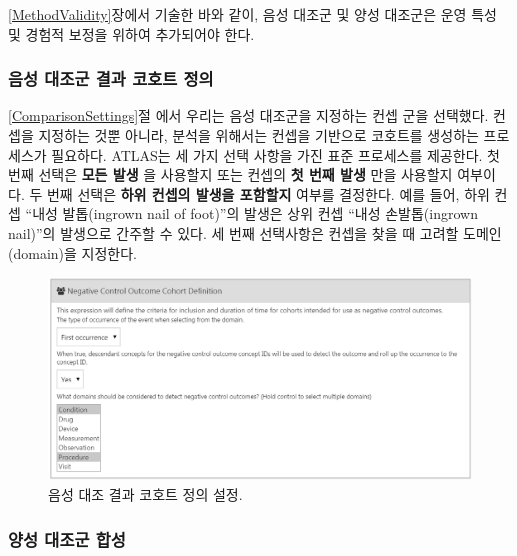 \documentclass[11pt]{book}
\theoremstyle{definition}
\theoremstyle{definition}
\theoremstyle{definition}
\theoremstyle{remark}
\begin{document}
\ref{MethodValidity}장에서 기술한 바와 같이, 음성 대조군 및 양성
대조군은 운영 특성 및 경험적 보정을 위하여 추가되어야 한다.

\subsubsection*{음성 대조군 결과 코호트 정의}\label{----}

\ref{ComparisonSettings}절 에서 우리는 음성 대조군을 지정하는 컨셉 군을
선택했다. 컨셉을 지정하는 것뿐 아니라, 분석을 위해서는 컨셉을 기반으로
코호트를 생성하는 프로세스가 필요하다. ATLAS는 세 가지 선택 사항을 가진
표준 프로세스를 제공한다. 첫 번째 선택은 \textbf{모든 발생} 을 사용할지
또는 컨셉의 \textbf{첫 번째 발생} 만을 사용할지 여부이다. 두 번째 선택은
\textbf{하위 컨셉의 발생을 포함할지} 여부를 결정한다. 예를 들어, 하위
컨셉 ``내성 발톱(ingrown nail of foot)''의 발생은 상위 컨셉 ``내성
손발톱(ingrown nail)''의 발생으로 간주할 수 있다. 세 번째 선택사항은
컨셉을 찾을 때 고려할 도메인(domain)을 지정한다.

\begin{figure}

{\centering \includegraphics[width=1\linewidth]{images/PopulationLevelEstimation/ncSettings} 

}

\caption{음성 대조 결과 코호트 정의 설정.}\label{fig:ncSettings}
\end{figure}

\subsubsection*{양성 대조군 합성}\label{--}
\end{document}
